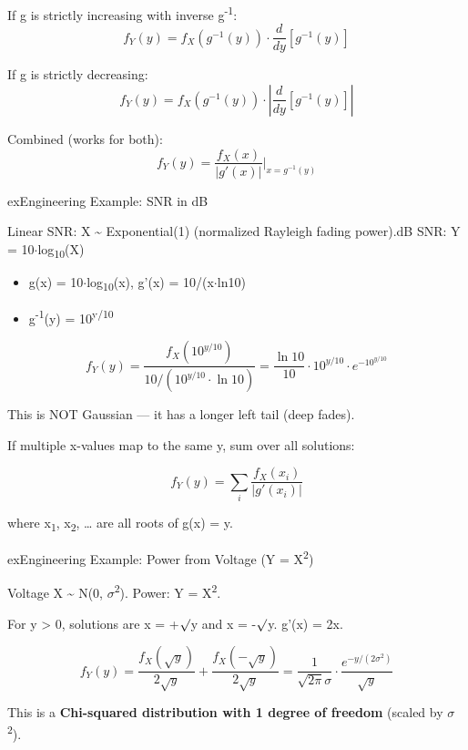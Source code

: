 
If g is strictly increasing with inverse g\textsuperscript{-1}:\PSbr{}\[f_Y(y) = f_X(g^{-1}(y)) \cdot \frac{d}{dy}[g^{-1}(y)]\]

If g is strictly decreasing:\PSbr{}\[f_Y(y) = f_X(g^{-1}(y)) \cdot \left|\frac{d}{dy}[g^{-1}(y)]\right|\]

Combined (works for both):\PSbr{}\[f_Y(y) = \frac{f_X(x)}{|g'(x)|}\bigg|_{x=g^{-1}(y)}\]

\begin{PSbox}[unbreakable]{ex}{Engineering Example: SNR in dB}

Linear SNR: X \textasciitilde{} Exponential(1) (normalized Rayleigh fading power).\PSbr{}dB SNR: Y = 10\ensuremath{\cdot}log\textsubscript{10}(X)

\begin{itemize}
\tightlist
\item
  g(x) = 10\ensuremath{\cdot}log\textsubscript{10}(x), g’(x) = 10/(x\ensuremath{\cdot}ln10)
\item
  g\textsuperscript{-1}(y) = 10\textsuperscript{y/10}
\end{itemize}

\[f_Y(y) = \frac{f_X(10^{y/10})}{10/(10^{y/10} \cdot \ln 10)} = \frac{\ln 10}{10} \cdot 10^{y/10} \cdot e^{-10^{y/10}}\]

This is NOT Gaussian — it has a longer left tail (deep fades).

\end{PSbox}



If multiple x-values map to the same y, sum over all solutions:

\[f_Y(y) = \sum_{i} \frac{f_X(x_i)}{|g'(x_i)|}\]

where x\textsubscript{1}, x\textsubscript{2}, … are all roots of g(x) = y.

\begin{PSbox}[unbreakable]{ex}{Engineering Example: Power from Voltage (Y = X\textsuperscript{2})}

Voltage X \textasciitilde{} N(0, \ensuremath{\sigma}\textsuperscript{2}). Power: Y = X\textsuperscript{2}.

For y \textgreater{} 0, solutions are x = +\ensuremath{\surd}y and x = -\ensuremath{\surd}y. g’(x) = 2x.

\[f_Y(y) = \frac{f_X(\sqrt{y})}{2\sqrt{y}} + \frac{f_X(-\sqrt{y})}{2\sqrt{y}} = \frac{1}{\sqrt{2\pi}\sigma} \cdot \frac{e^{-y/(2\sigma^2)}}{\sqrt{y}}\]

This is a \textbf{Chi-squared distribution with 1 degree of freedom} (scaled by \ensuremath{\sigma}\textsuperscript{2}).

\end{PSbox}

